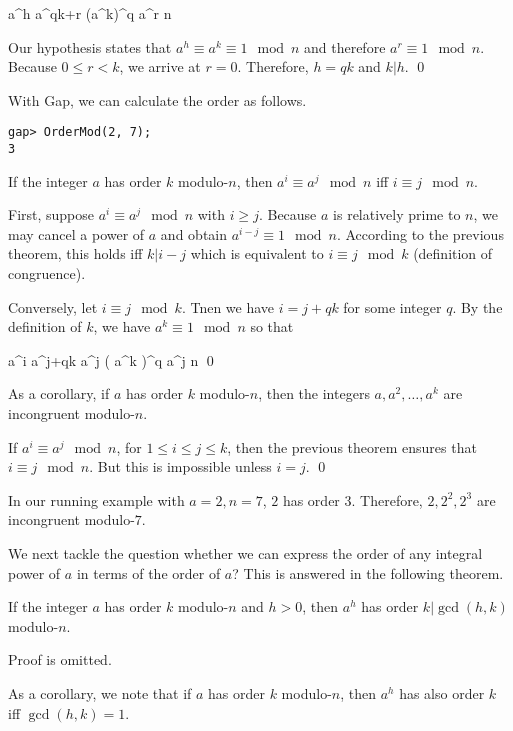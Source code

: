 \bee
a^h \equiv a^{qk+r} \equiv \left(a^k\right)^q a^r \mod n
\eee

Our hypothesis states that $a^h \equiv a^k \equiv 1 \mod n$ and therefore $a^r \equiv 1 \mod n$. Because $0 \leq r < k$, we arrive at $r=0$. Therefore, $h = qk$ and $k | h$. \qed

With Gap, we can calculate the order as follows.

\begin{verbatim}
gap> OrderMod(2, 7);
3
\end{verbatim}


\begin{theorem}
  \label{2021-03-02:th1}
  If the integer $a$ has order $k$ modulo-$n$, then $a^i \equiv a^j \mod n$ iff $i \equiv j \mod n$.
\end{theorem}

First, suppose $a^i \equiv a^j \mod n$ with $i \geq j$. Because $a$ is relatively prime to $n$, we may cancel a power of $a$ and obtain $a^{i-j} \equiv 1 \mod n$. According to the previous theorem, this holds iff $k | i-j$ which is equivalent to $i \equiv j \mod k$ (definition of congruence). 

Conversely, let $i \equiv j \mod k$. Tnen we have $i = j+  qk$ for some integer $q$. By the definition of $k$, we have $a^k \equiv 1 \mod n$ so that

\bee
a^i \equiv a^{j+qk} \equiv a^j \left( a^k \right)^q \equiv a^j \mod n \qed
\eee

As a corollary, if $a$ has order $k$ modulo-$n$, then the integers $a, a^2, \ldots, a^k$ are incongruent modulo-$n$.

If $a^i \equiv a^j \mod n$, for $1 \leq i \leq j \leq k$, then the previous theorem ensures that $i \equiv j \mod n$. But this is impossible unless $i=j$. \qed

In our running example with $a=2, n=7$, $2$ has order $3$. Therefore, $2, 2^2, 2^3$ are incongruent modulo-$7$.

We next tackle the question whether we can express the order of any integral power of $a$ in terms of the order of $a$? This is answered in the following theorem.

\begin{theorem}
  If the integer $a$ has order $k$ modulo-$n$ and $h > 0$, then $a^h$ has order $k | \gcd(h,k)$ modulo-$n$.
\end{theorem}

Proof is omitted.

As a corollary, we note that if $a$ has order $k$ modulo-$n$, then $a^h$ has also order $k$ iff $\gcd(h,k)=1$.

